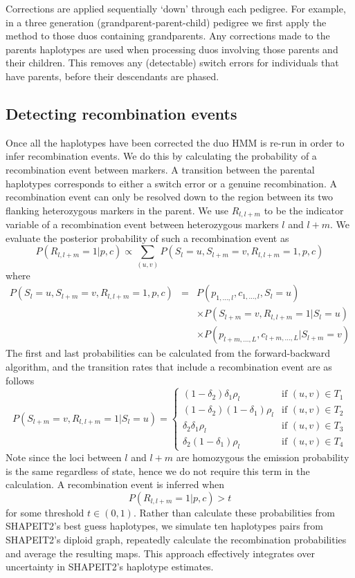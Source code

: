 Corrections are applied sequentially `down' through each pedigree. For example, in a three generation (grandparent-parent-child) pedigree we first apply the method to those duos containing grandparents. Any corrections made to the parents haplotypes are used when processing duos involving those parents and their children. This removes any (detectable) switch errors for individuals that have parents, before their descendants are phased. 

\subsection{Detecting recombination events}
Once all the haplotypes have been corrected the duo HMM is re-run in order to infer recombination events. We do this by calculating the probability of a recombination event between markers. A transition between the parental haplotypes corresponds to either a switch error or a genuine recombination.  A recombination event can only be resolved down to the region between its two flanking heterozygous markers in the parent.  We use $R_{l,l+m}$ to be the indicator variable of a recombination event between heterozygous markers $l$ and $l+m$. We evaluate the posterior probability of such a recombination event as 
\[P(R_{l,l+m}=1|p, c) \propto \sum_{ (u,v)} P(S_l=u,S_{l+m}=v, R_{l,l+m}=1, p,c)\] 
where
\begin{eqnarray*}
P(S_l=u,S_{l+m}=v, R_{l,l+m}=1, p,c) & = & P(p_{1,...,l},c_{1,...,l},S_l=u)  \\
&&\times P(S_{l+m}=v, R_{l,l+m}=1|S_l=u) \\
&& \times P(p_{l+m,...,L},c_{l+m,...,L}|S_{l+m}=v)
\end{eqnarray*}
The first and last probabilities can be calculated from the forward-backward algorithm, and the transition rates that include a recombination event are as follows
\small
\[ P(S_{l+m}=v, R_{l,l+m}=1|S_l=u) = \left\{ \begin{array}{ll}
    (1-\delta_2) \delta_1\rho_l & \mbox{if } (u,v) \in T_1\\
    (1-\delta_2) (1-\delta_1)\rho_l & \mbox{if } (u,v) \in T_2\\
    \delta_2 \delta_1\rho_l  &  \mbox{if } (u,v) \in T_3 \\
    \delta_2 (1-\delta_1)\rho_l &  \mbox{if } (u,v) \in T_4   
\end{array} \right. \] 
\normalsize
Note since the loci between $l$ and $l+m$ are homozygous the emission probability is the same regardless of state, hence we do not require this term in the calculation. A recombination event is inferred when 
\[P(R_{l,l+m}=1|p, c) > t\]
for some threshold $t \in (0,1)$. Rather than calculate these probabilities from SHAPEIT2's best guess haplotypes, we simulate ten haplotypes pairs from SHAPEIT2's diploid graph, repeatedly calculate the recombination probabilities and average the resulting maps. This approach effectively integrates over uncertainty in SHAPEIT2's haplotype estimates.

